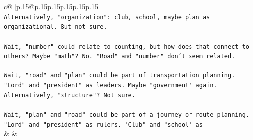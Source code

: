 \documentclass{article}
\begin{document}
{\begin{supertabular}{c@{$\;$}|p{.15\linewidth}@{}p{.15\linewidth}p{.15\linewidth}p{.15\linewidth}p{.15\linewidth}p{.15\linewidth}}
{{{\\ 
\texttt{Alternatively, "organization": club, school, maybe plan as organizational. But not sure.} \\
\\ 
\texttt{Wait, "number" could relate to counting, but how does that connect to others? Maybe "math"? No. "Road" and "number" don't seem related.} \\
\\ 
\texttt{Wait, "road" and "plan" could be part of transportation planning. "Lord" and "president" as leaders. Maybe "government" again. Alternatively, "structure"? Not sure.} \\
\\ 
\texttt{Wait, "plan" and "road" could be part of a journey or route planning. "Lord" and "president" as rulers. "Club" and "school" as} \\
            }
        }
    }
    & & \\ \\


\end{supertabular}}
\end{document}
